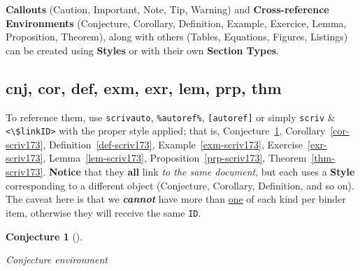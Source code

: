 \documentclass[
  12pt,
  a4paper,
  numbers=noenddot,
  titlepage,
  toclink=all,
  toc=bibliography]{scrbook}
\theoremstyle{definition}
\theoremstyle{definition}
\theoremstyle{definition}
\theoremstyle{plain}
\theoremstyle{plain}
\theoremstyle{plain}
\newtheorem{conjecture}{Conjecture}[section]
\theoremstyle{plain}
\theoremstyle{plain}
\theoremstyle{remark}
\begin{document}
\begin{tcolorbox}[enhanced jigsaw, bottomtitle=1mm, titlerule=0mm, coltitle=black, title=\textcolor{quarto-callout-tip-color}{\faLightbulb}\hspace{0.5em}{Tip}, opacityback=0, colframe=quarto-callout-tip-color-frame, breakable, colbacktitle=quarto-callout-tip-color!10!white, left=2mm, toptitle=1mm, arc=.35mm, toprule=.15mm, rightrule=.15mm, bottomrule=.15mm, colback=white, leftrule=.75mm, opacitybacktitle=0.6]

\textbf{Callouts} (Caution, Important, Note, Tip, Warning) and
\textbf{Cross-reference Environments} (Conjecture, Corollary,
Definition, Example, Exercice, Lemma, Proposition, Theorem), along with
others (Tables, Equations, Figures, Listings) can be created using
\textbf{Styles} or with their own \textbf{Section Types}.

\end{tcolorbox}

\hypertarget{sec-scriv173}{%
\subsection{cnj, cor, def, exm, exr, lem, prp, thm}\label{sec-scriv173}}

\protect\hypertarget{scriv173}{}{}

To reference them, use \texttt{scrivautο}, \texttt{\%autοref\%},
\texttt{{[}autοref{]}} or simply \texttt{scriv} \&
\texttt{\textless{}\textbackslash{}\$linkID\textgreater{}} with the
proper style applied; that is,
\protect\hypertarget{cite_37}{}{\label{cite_37}Conjecture~\ref{cnj-scriv173}},
\protect\hypertarget{cite_38}{}{\label{cite_38}Corollary~\ref{cor-scriv173}},
\protect\hypertarget{cite_39}{}{\label{cite_39}Definition~\ref{def-scriv173}},
\protect\hypertarget{cite_40}{}{\label{cite_40}Example~\ref{exm-scriv173}},
\protect\hypertarget{cite_41}{}{\label{cite_41}Exercise~\ref{exr-scriv173}},
\protect\hypertarget{cite_42}{}{\label{cite_42}Lemma~\ref{lem-scriv173}},
\protect\hypertarget{cite_43}{}{\label{cite_43}Proposition~\ref{prp-scriv173}},
\protect\hypertarget{cite_44}{}{\label{cite_44}Theorem~\ref{thm-scriv173}}.
\textbf{Notice} that they \textbf{all} link \emph{to the same document},
but each uses a \textbf{Style} corresponding to a different object
(Conjecture, Corollary, Definition, and so on). The caveat here is that
we \textbf{\emph{cannot}} have more than \ul{one} of each kind per
binder item, otherwise they will receive the same \texttt{ID}.

\begin{conjecture}[]\protect\hypertarget{cnj-scriv173}{}\label{cnj-scriv173}

Conjecture environment

\end{conjecture}
\end{document}
